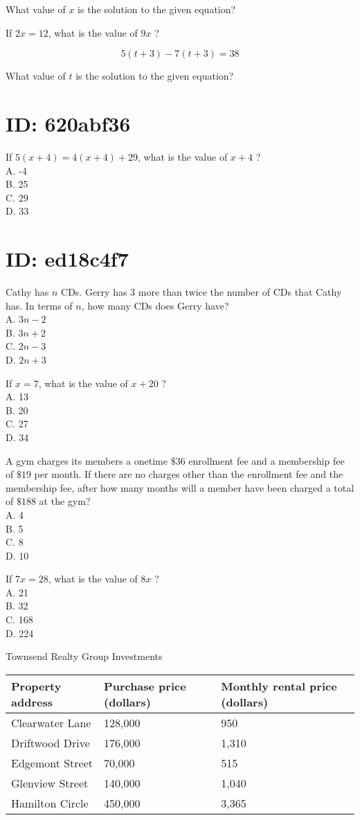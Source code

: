 What value of $x$ is the solution to the given equation?

If $2 x=12$, what is the value of $9 x$ ?

$$
5(t+3)-7(t+3)=38
$$

What value of $t$ is the solution to the given equation?

\section*{ID: 620abf36}
If $5(x+4)=4(x+4)+29$, what is the value of $x+4$ ?\\
A. -4\\
B. 25\\
C. 29\\
D. 33

\section*{ID: ed18c4f7}
Cathy has $n$ CDs. Gerry has 3 more than twice the number of CDs that Cathy has. In terms of $n$, how many CDs does Gerry have?\\
A. $3 n-2$\\
B. $3 n+2$\\
C. $2 n-3$\\
D. $2 n+3$

If $x=7$, what is the value of $x+20$ ?\\
A. 13\\
B. 20\\
C. 27\\
D. 34

A gym charges its members a onetime $\$ 36$ enrollment fee and a membership fee of $\$ 19$ per month. If there are no charges other than the enrollment fee and the membership fee, after how many months will a member have been charged a total of $\$ 188$ at the gym?\\
A. 4\\
B. 5\\
C. 8\\
D. 10

If $7 x=28$, what is the value of $8 x$ ?\\
A. 21\\
B. 32\\
C. 168\\
D. 224

Townsend Realty Group Investments

\begin{center}
\begin{tabular}{|l|l|l|}
\hline
Property address & Purchase price (dollars) & Monthly rental price (dollars) \\
\hline
Clearwater Lane & 128,000 & 950 \\
\hline
Driftwood Drive & 176,000 & 1,310 \\
\hline
Edgemont Street & 70,000 & 515 \\
\hline
Glenview Street & 140,000 & 1,040 \\
\hline
Hamilton Circle & 450,000 & 3,365 \\
\hline
\end{tabular}
\end{center}

